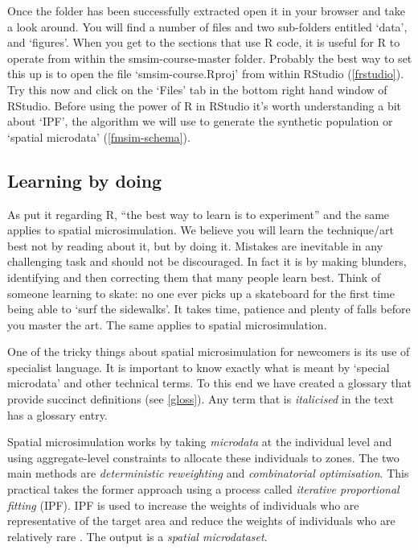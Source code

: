 \documentclass[a4paper, 11pt, twoside]{article}
\begin{document}
Once the folder has been successfully extracted open it in
your browser and take a look around. You will find a number of files
and two sub-folders
entitled `data', and `figures'. When you get to the
sections that use R code, it is useful for R to operate from
within the smsim-course-master folder. Probably the best way
to set this up is to open the file `smsim-course.Rproj' from
within RStudio (\cref{frstudio}).
Try this now and click on the `Files' tab in
the bottom right hand window of RStudio.
Before using the power of R in RStudio it's worth
understanding a bit about `IPF', the algorithm we will use to generate
the synthetic population or `spatial microdata' (\cref{fmsim-schema}).

\subsection{Learning by doing}

As \citet[xxii]{kabacoff2011r} put it regarding R, ``the best
way to learn is to experiment'' and the same applies to spatial microsimulation.
We believe you will learn the technique/art best not by reading about it, 
but by doing it. Mistakes are inevitable in any challenging task and should not
be discouraged. In fact it is by making blunders, identifying and then correcting them
that many people learn best. Think of someone learning to skate: no one ever
picks up a skateboard for the first time being able to `surf the sidewalks'. It
takes time, patience and plenty of falls before you master the art.
The same applies to spatial microsimulation.

One of the tricky things about spatial microsimulation for newcomers is its use
of specialist language. It is important to know exactly what is meant by
`special microdata' and other technical terms. To this end we have created a
glossary that provide succinct definitions (see \cref{gloss}). Any term that is
\emph{italicised} in the text has a glossary entry.

Spatial microsimulation works by taking \emph{microdata} at the individual level
and using aggregate-level constraints to allocate these individuals to zones.
The two main methods are \emph{deterministic reweighting} and \emph{combinatorial optimisation}.
This practical takes the former approach using a process called \emph{iterative proportional fitting}
(IPF). IPF is used to increase the weights of individuals who are representative
of the target area and reduce the weights of individuals who are relatively
rare \citep{Lovelace2013-trs}.
The output is a \emph{spatial microdataset}.
\end{document}
